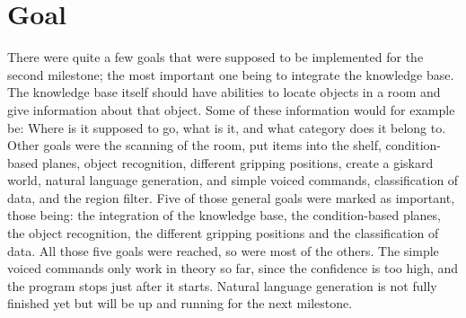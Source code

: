 \documentclass[main.tex]{subfiles}
\begin{document}
	
    \chapter{Goal}
		
    There were quite a few goals that were supposed to be implemented for the second milestone; the most important one being to integrate the knowledge base. The knowledge base itself should have abilities to locate objects in a room and give information about that object. Some of these information would for example be: Where is it supposed to go, what is it, and what category does it belong to.
    Other goals were the scanning of the room, put items into the shelf, condition-based planes, object recognition, different gripping positions, create a giskard world, natural language generation, and simple voiced commands, classification of data, and the region filter. 
    Five of those general goals were marked as important, those being: the integration of the knowledge base, the condition-based planes, the object recognition, the different gripping positions and the classification of data. All those five goals were reached, so were most of the others. The simple voiced commands only work in theory so far, since the confidence is too high, and the program stops just after it starts. Natural language generation is not fully finished yet but will be up and running for the next milestone.
    
\end{document}
